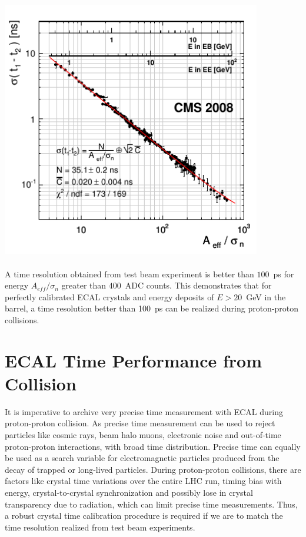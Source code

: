 \begin{center}
\centering
\mbox{\includegraphics[height=0.6\textwidth, width=0.85\textwidth]{THESISPLOTS/ECAL_Timing_Resolution.png}}
\label{fig:FitTimeRes}
\end{center}
\paragraph{} %
A time resolution obtained from test beam experiment is better than $100$~ps for energy $A_{eff}/\sigma_{n}$ greater than $400$~ADC counts. This demonstrates that for perfectly calibrated ECAL crystals and energy deposits of $E > 20$~GeV in the barrel, a time resolution better than 100~ps can be realized during proton-proton collisions. %

\section{ECAL Time Performance from Collision}
It is imperative to archive very precise time measurement with ECAL during proton-proton collision.
As precise time measurement can be used to reject particles like cosmic rays, beam halo muons, electronic noise and out-of-time proton-proton interactions, with broad time distribution. Precise time can equally be used as a search variable for electromagnetic particles produced from the decay of trapped or long-lived particles. During proton-proton collisions, there are factors like crystal time variations over the entire LHC run, timing bias with energy, crystal-to-crystal synchronization and possibly lose in crystal transparency due to radiation, which can limit precise time measurements. Thus, a robust crystal time calibration procedure is required if we are to match the time resolution realized from test beam experiments.
